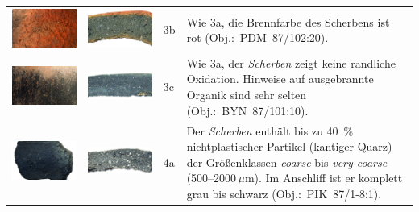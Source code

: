 \begin{footnotesize}
{\begin{longtable}{@{}m{}m{}m{}m{}@{}}
\includegraphics[width=.3\textwidth]{tbl/Tab_Fabrics/PDM87-102-20_5cm.jpg} & \includegraphics[width=.3\textwidth]{tbl/Tab_Fabrics/PDM87-102-20_2cm.jpg} & 3b & Wie 3a, die Brennfarbe des Scherbens ist rot (Obj.:~PDM~87/102:20). \\
\includegraphics[width=.3\textwidth]{tbl/Tab_Fabrics/BYN87-101-10_5cm.jpg} & \includegraphics[width=.3\textwidth]{tbl/Tab_Fabrics/BYN87-101-10_2cm.jpg} & 3c & Wie 3a, der \textit{Scherben} zeigt keine randliche Oxidation. Hinweise auf ausgebrannte Organik sind sehr selten (Obj.:~BYN~87/101:10). \\
\includegraphics[width=.3\textwidth]{tbl/Tab_Fabrics/PIK87-1-8-1_5cm.jpg} & \includegraphics[width=.3\textwidth]{tbl/Tab_Fabrics/PIK87-1-8-1_2cm.jpg} & 4a & Der \textit{Scherben} enthält bis zu 40~\% nichtplastischer Partikel (kantiger Quarz) der Größenklassen \textit{coarse} bis \textit{very coarse} (500--2000\,$\mu$m). Im Anschliff ist er komplett grau bis schwarz (Obj.:~PIK~87/1-8:1).\vspace{1em} \\

\end{longtable}}
\end{footnotesize}
